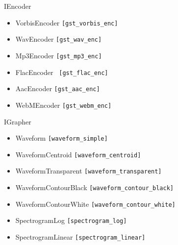 \documentclass[10pt, final, hyperref, table]{beamer}
\begin{document}
\begin{frame}
\begin{minipage}{0.5\linewidth}
      \begin{block}{IEncoder}
      \begin{itemize}
      \item VorbisEncoder \texttt{[gst\_vorbis\_enc]}
      \item WavEncoder \texttt{[gst\_wav\_enc]}
      \item Mp3Encoder \texttt{[gst\_mp3\_enc]}
      \item FlacEncoder \texttt{ [gst\_flac\_enc]}
      \item AacEncoder \texttt{[gst\_aac\_enc]}
      \item WebMEncoder \texttt{[gst\_webm\_enc]}
      \end{itemize}
    \end{block}
  \begin{block}{IGrapher}
      \begin{itemize}
      \item Waveform \texttt{[waveform\_simple]}
      \item WaveformCentroid \texttt{[waveform\_centroid]}
      \item \alert{WaveformTransparent} \texttt{[waveform\_transparent]}
      \item WaveformContourBlack \texttt{[waveform\_contour\_black]}
      \item WaveformContourWhite \texttt{[waveform\_contour\_white]}
      \item SpectrogramLog \texttt{[spectrogram\_log]}
      \item \alert{SpectrogramLinear} \texttt{[spectrogram\_linear]}
      \end{itemize}
    \end{block}
   \end{minipage}

\end{frame}
\end{document}
